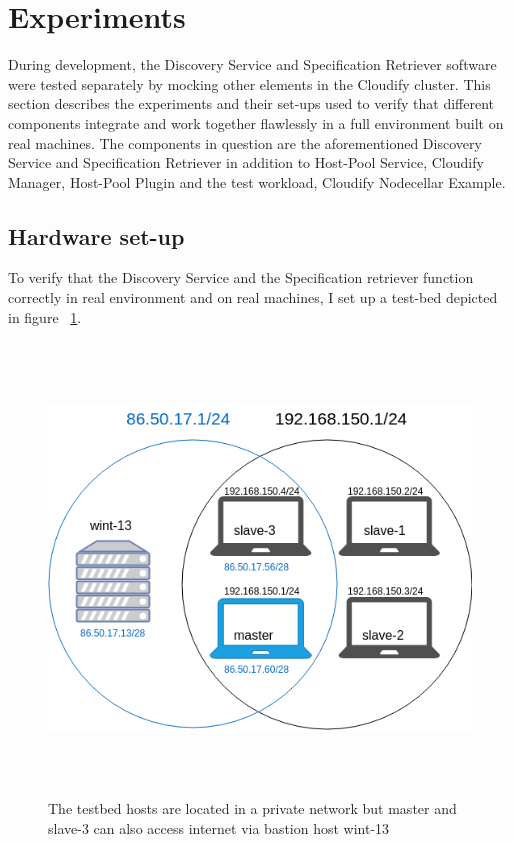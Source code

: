 \section{Experiments} \label{experiments}

During development, the Discovery Service and Specification Retriever software were tested separately by mocking other elements in the Cloudify cluster. This section describes the experiments and their set-ups used to verify that different components integrate and work together flawlessly in a full environment built on real machines. The components in question are the aforementioned Discovery Service and Specification Retriever in addition to Host-Pool Service, Cloudify Manager, Host-Pool Plugin and the test workload, Cloudify Nodecellar Example\cite{Nodecellar}.

\subsection{Hardware set-up}
To verify that the Discovery Service and the Specification retriever function correctly in real environment and on real machines, I set up a test-bed depicted in figure ~\ref{fig:network-venn}.

 \begin{figure}[ht!]
\centering
  \includegraphics[width=12cm,height=12cm, keepaspectratio]{Network-venn.png}%
  \caption{The testbed hosts are located in a private network but master and slave-3 can also access internet via bastion host wint-13}
  \label{fig:network-venn}
\end{figure}

